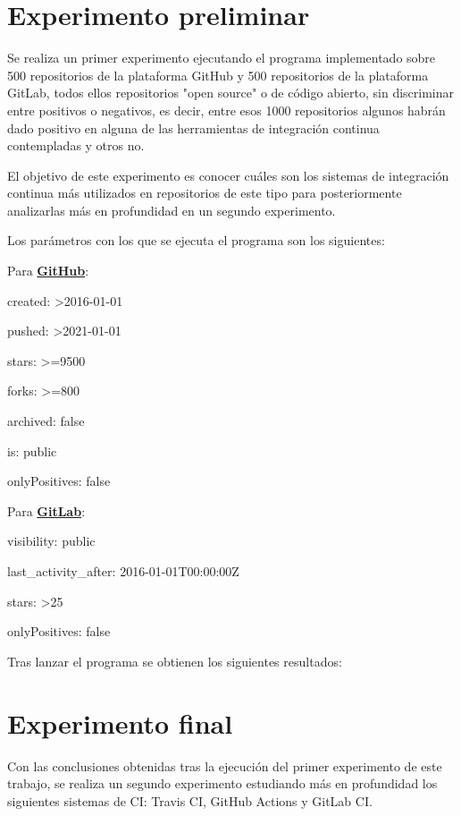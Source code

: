 \section{Experimento preliminar}
Se realiza un primer experimento ejecutando el programa implementado sobre 500 repositorios de la plataforma GitHub y 500 repositorios de la plataforma GitLab, todos ellos repositorios "open source" o de código abierto, sin discriminar entre positivos o negativos, es decir, entre esos 1000 repositorios algunos habrán dado positivo en alguna de las herramientas de integración continua contempladas y otros no.

El objetivo de este experimento es conocer cuáles son los sistemas de integración continua más utilizados en repositorios de este tipo para posteriormente analizarlas más en profundidad en un segundo experimento.

Los parámetros con los que se ejecuta el programa son los siguientes:
\begin{compactitem}
    \item Para \textbf{\underline{GitHub}}:
    \begin{compactitem}
        \item created: \textgreater2016-01-01
        \item pushed: \textgreater2021-01-01
        \item stars: \textgreater=9500
        \item forks: \textgreater=800
        \item archived: false
        \item is: public
        \item onlyPositives: false
    \end{compactitem}
    \item Para \textbf{\underline{GitLab}}:
    \begin{compactitem}
        \item visibility: public
        \item last\_activity\_after: 2016-01-01T00:00:00Z
        \item stars: \textgreater25
        \item onlyPositives: false
    \end{compactitem}
\end{compactitem}

Tras lanzar el programa se obtienen los siguientes resultados:

\section{Experimento final}
Con las conclusiones obtenidas tras la ejecución del primer experimento de este trabajo, se realiza un segundo experimento estudiando más en profundidad los siguientes sistemas de CI: Travis CI, GitHub Actions y GitLab CI.

